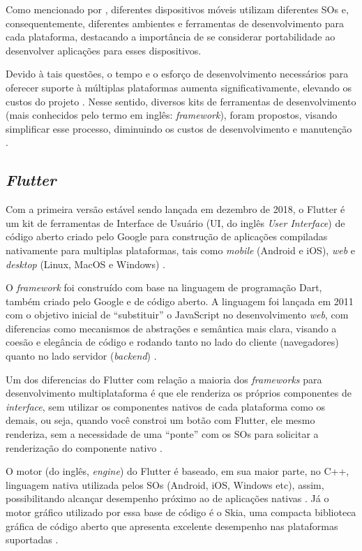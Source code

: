 Como mencionado por , diferentes dispositivos móveis utilizam diferentes SOs e, consequentemente, diferentes
ambientes e ferramentas de desenvolvimento para cada plataforma, destacando a importância de se considerar portabilidade ao desenvolver aplicações
para esses dispositivos.

Devido à tais questões, o tempo e o esforço de desenvolvimento necessários para oferecer suporte à múltiplas plataformas aumenta
significativamente, elevando os custos do projeto \cite{Henning2013,Wasserman2010}. Nesse sentido, diversos kits de ferramentas de
desenvolvimento (mais conhecidos pelo termo em inglês: \emph{framework}), foram propostos, visando simplificar esse processo, diminuindo os
custos de desenvolvimento e manutenção \cite{Martinez2017,Francese2015}.

\subsection{\emph{Flutter}}

Com a primeira versão estável sendo lançada em dezembro de 2018, o Flutter é um kit de ferramentas de Interface
de Usuário (UI, do inglês \emph{User Interface}) de código aberto criado pelo Google para construção de aplicações compiladas nativamente
para multiplas plataformas, tais como \emph{mobile} (Android e iOS), \emph{web} e \emph{desktop} (Linux, MacOS e Windows) \cite{kuzmin2020experience}.

O \emph{framework} foi construído com base na linguagem de programação Dart, também criado pelo Google e de código aberto.
A linguagem foi lançada em 2011 com o objetivo inicial de ``substituir'' o JavaScript no desenvolvimento \emph{web},
com diferencias como mecanismos de abstrações e semântica mais clara, visando a coesão e elegância de código e
rodando tanto no lado do cliente (navegadores) quanto no lado servidor
(\emph{backend}) \cite{walrath2012dart}.

Um dos diferencias do Flutter com relação a maioria dos \emph{frameworks} para desenvolvimento multiplataforma é que ele renderiza os próprios
componentes de \emph{interface}, sem utilizar os componentes nativos de cada plataforma como os demais, ou seja, quando você constroi um botão com Flutter,
ele mesmo renderiza, sem a necessidade de uma ``ponte'' com os SOs para solicitar a renderização do componente nativo \cite{zammetti2019practical,boukhary2019clean}.

O motor (do inglês, \emph{engine}) do Flutter é baseado, em sua maior parte, no C++, linguagem nativa utilizada pelos SOs (Android, iOS, Windows etc), assim,
possibilitando alcançar desempenho próximo ao de aplicações nativas \cite{zammetti2019practical,kuzmin2020experience}. Já o motor gráfico utilizado por essa
base de código é o Skia, uma compacta biblioteca gráfica de código aberto que apresenta excelente desempenho nas plataformas
suportadas \cite{zammetti2019practical,boukhary2019clean}.

